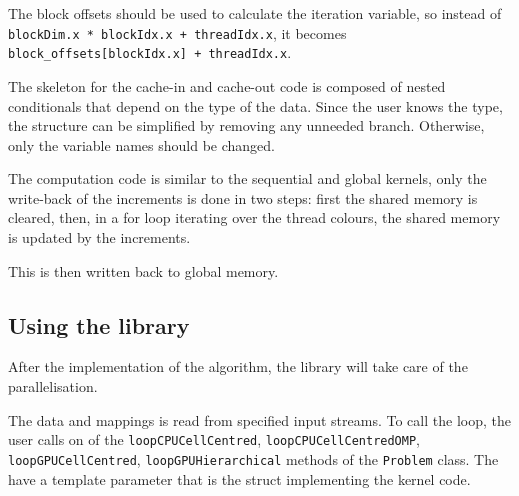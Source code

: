 The block offsets should be used to calculate the iteration variable, so instead
of \lstinline!blockDim.x * blockIdx.x + threadIdx.x!, it becomes
\lstinline!block_offsets[blockIdx.x] + threadIdx.x!.

The skeleton for the cache-in and cache-out code is composed of nested
conditionals that depend on the type of the data. Since the user knows the type,
the structure can be simplified by removing any unneeded branch. Otherwise, only
the variable names should be changed.

The computation code is similar to the sequential and global kernels, only the
write-back of the increments is done in two steps: first the shared memory is
cleared, then, in a for loop iterating over the thread colours, the shared
memory is updated by the increments.

This is then written back to global memory.

\subsection{Using the library}

After the implementation of the algorithm, the library will take care of the
parallelisation.

The data and mappings is read from specified input streams. To call the loop,
the user calls on of the \lstinline!loopCPUCellCentred!,
\lstinline!loopCPUCellCentredOMP!, \lstinline!loopGPUCellCentred!,
\lstinline!loopGPUHierarchical! methods of the \lstinline!Problem! class. The
have a template parameter that is the struct implementing the kernel code.
